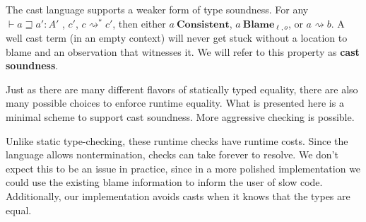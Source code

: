
The cast language supports a weaker form of type soundness. %
For any $\vdash a\sqsupseteq a':A'$ , $c'$, $c\rightsquigarrow^{*}c'$, then either $a\ \mathbf{Consistent}$, $a\ \mathbf{Blame}_{\ell,o}$, or $a\rightsquigarrow b$.
A well cast term (in an empty context) will never get stuck without a location to blame and an observation that witnesses it.
We will refer to this property as \textbf{cast soundness}. %
 
 
Just as there are many different flavors of statically typed equality, there are also many possible choices to enforce runtime equality.
What is presented here is a minimal scheme to support cast soundness.
More aggressive checking is possible.
 
Unlike static type-checking, these runtime checks have runtime costs.
Since the language allows nontermination, checks can take forever to resolve.
We don't expect this to be an issue in practice, since in a more polished implementation we could use the existing blame information to inform the user of slow code.
Additionally, our implementation avoids casts when it knows that the types are equal.
